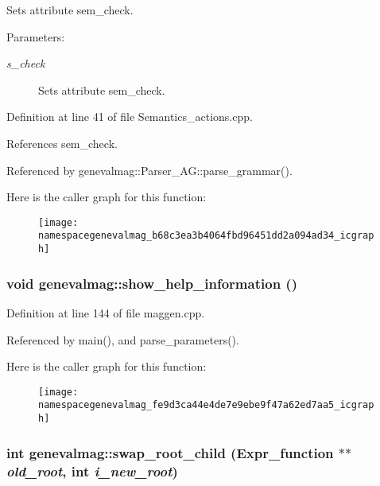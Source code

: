 Sets attribute sem\_\-check. \begin{Desc}
\item[Parameters:]
\begin{description}
\item[{\em s\_\-check}]Sets attribute sem\_\-check. \end{description}
\end{Desc}


Definition at line 41 of file Semantics\_\-actions.cpp.

References sem\_\-check.

Referenced by genevalmag::Parser\_\-AG::parse\_\-grammar().

Here is the caller graph for this function:\nopagebreak
\begin{figure}[H]
\begin{center}
\leavevmode
\texttt{[image: namespacegenevalmag\_b68c3ea3b4064fbd96451dd2a094ad34\_icgraph]}
\end{center}
\end{figure}
\hypertarget{namespacegenevalmag_fe9d3ca44e4de7e9ebe9f47a62ed7aa5}{
\subsubsection[{show\_\-help\_\-information}]{\setlength{\rightskip}{0pt plus 5cm}void genevalmag::show\_\-help\_\-information ()}}
\label{namespacegenevalmag_fe9d3ca44e4de7e9ebe9f47a62ed7aa5}




Definition at line 144 of file maggen.cpp.

Referenced by main(), and parse\_\-parameters().

Here is the caller graph for this function:\nopagebreak
\begin{figure}[H]
\begin{center}
\leavevmode
\texttt{[image: namespacegenevalmag\_fe9d3ca44e4de7e9ebe9f47a62ed7aa5\_icgraph]}
\end{center}
\end{figure}
\hypertarget{namespacegenevalmag_5132358a5088f64e976aa18643cff4d8}{
\subsubsection[{swap\_\-root\_\-child}]{\setlength{\rightskip}{0pt plus 5cm}int genevalmag::swap\_\-root\_\-child (Expr\_\-function $\ast$$\ast$ {\em old\_\-root}, \/  int {\em i\_\-new\_\-root})}}
\label{namespacegenevalmag_5132358a5088f64e976aa18643cff4d8}


